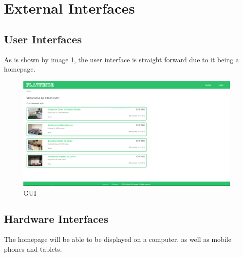 \section{External Interfaces}

\subsection{User Interfaces}
	As is shown by image \ref{image-flatfindrScreenshot}, the user interface is
	straight forward due to it being a homepage.
	
\begin{figure}[p]
    \centering
	\includegraphics[width=12cm]{images/flatfindrScreenshot}
	\caption{GUI}
    \label{image-flatfindrScreenshot}
\end{figure}
	
\subsection{Hardware Interfaces}
	The homepage will be able to be displayed on a computer, as well as mobile
	phones and tablets.
	
